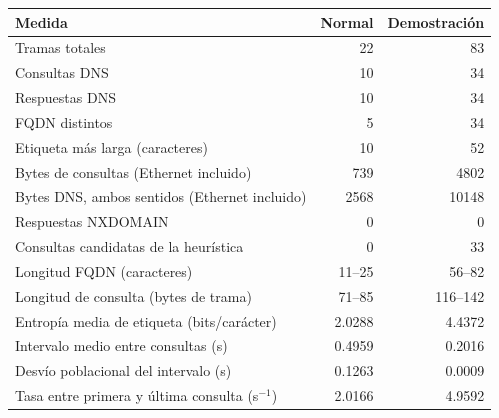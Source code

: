 \begin{tabularx}{\textwidth}{Xrr}
\toprule
Medida & Normal & Demostración \\
\midrule
Tramas totales & 22 & 83 \\
Consultas DNS & 10 & 34 \\
Respuestas DNS & 10 & 34 \\
FQDN distintos & 5 & 34 \\
Etiqueta más larga (caracteres) & 10 & 52 \\
Bytes de consultas (Ethernet incluido) & 739 & 4802 \\
Bytes DNS, ambos sentidos (Ethernet incluido) & 2568 & 10148 \\
Respuestas NXDOMAIN & 0 & 0 \\
Consultas candidatas de la heurística & 0 & 33 \\
Longitud FQDN (caracteres) & 11--25 & 56--82 \\
Longitud de consulta (bytes de trama) & 71--85 & 116--142 \\
Entropía media de etiqueta (bits/carácter) & 2.0288 & 4.4372 \\
Intervalo medio entre consultas (s) & 0.4959 & 0.2016 \\
Desvío poblacional del intervalo (s) & 0.1263 & 0.0009 \\
Tasa entre primera y última consulta (s$^{-1}$) & 2.0166 & 4.9592 \\
\bottomrule
\end{tabularx}
